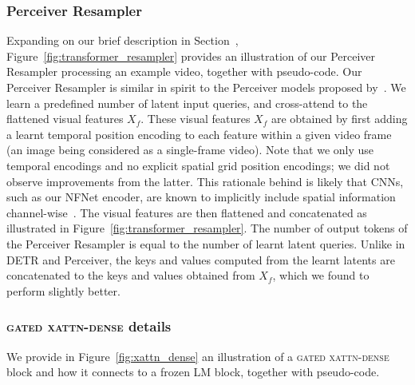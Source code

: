 \subsubsection{Perceiver Resampler}
\label{app:transformer_resampler}
Expanding on our brief description in Section~,
Figure~\ref{fig:transformer_resampler} provides an illustration of our Perceiver Resampler processing an example video, together with pseudo-code.
Our Perceiver Resampler is similar in spirit to the Perceiver models proposed by~\citet{jaegle2021perceiver}.
We learn a predefined number of latent input queries, and cross-attend to the flattened visual features $X_f$.
These visual features $X_f$ are obtained by first adding a learnt temporal position encoding to each feature within a given video frame (an image being considered as a single-frame video).
Note that we only use temporal encodings and no explicit spatial grid position encodings;
we did not observe improvements from the latter.
This rationale behind is likely that CNNs, such as our NFNet encoder, are known to implicitly include spatial information channel-wise~\citep{islam2021global}.
The visual features are then flattened and concatenated as illustrated in Figure~\ref{fig:transformer_resampler}.
The number of output tokens of the Perceiver Resampler is equal to the number of learnt latent queries.
Unlike in DETR and Perceiver, the keys and values computed from the learnt latents are concatenated to the keys and values obtained from $X_f$, which we found to perform slightly better.


\subsubsection{\textsc{gated xattn-dense} details}
\label{app:xattn_dense}
We provide in Figure~\ref{fig:xattn_dense} an illustration of a \textsc{gated xattn-dense} block and how it connects to a frozen LM block, together with pseudo-code.

